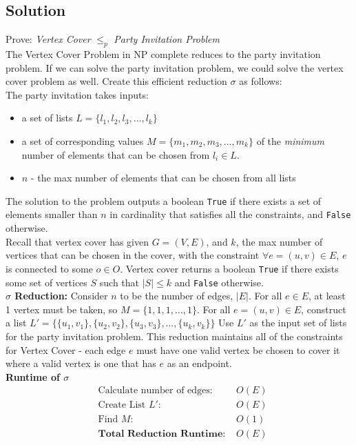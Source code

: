 \documentclass[11pt]{article}
\begin{document}
\subsection{Solution}

Prove: \textit{Vertex Cover} $\leq_p$ \textit{Party Invitation Problem}\\

The Vertex Cover Problem in NP complete reduces to the party invitation problem. If we can solve the party invitation problem, we could solve the vertex cover problem as well. Create this efficient reduction $\sigma$ as follows:  \\

The party invitation takes inputs:
\begin{itemize}
\item a set of lists $L = \{l_1,l_2,l_3, \ldots, l_{k}\}$
\item a set of corresponding values $M = \{m_1, m_2, m_3, \ldots, m_k\}$ of the \textit{minimum} number of elements that can be chosen from $l_i \in L$.
\item $n$ - the max number of elements that can be chosen from all lists
\end{itemize}

The solution to the problem outputs a boolean \texttt{True} if there exists a set of elements smaller than $n$ in cardinality  that satisfies all the constraints, and \texttt{False} otherwise.\\

Recall that vertex cover has given $G = (V,E)$, and $k$, the max number of vertices that can be chosen in the cover, with the constraint $\forall e = (u,v) \in E$, $e$ is connected to some $o \in O$. Vertex cover returns a boolean \texttt{True} if there exists some set of vertices $S$ such that $|S| \leq k $ and \texttt{False} otherwise. \\

\textbf{$\sigma$ Reduction:}
Consider $n$ to be the number of edges, $|E|$. For all $e \in E$, at least 1 vertex must be taken, so $M = \{1,1,1,\ldots, 1\}$. For all $e = (u,v) \in E$, construct a list $L' = \{\{u_1,v_1\},\{u_2,v_2\},\{u_3,v_3\},\ldots, \{u_k,v_k\}\}$ Use $L'$ as the input set of lists for the party invitation problem. This reduction maintains all of the constraints for Vertex Cover -  each edge $e$ must have one valid vertex be chosen to cover it where a valid vertex is one that has $e$ as an endpoint. \\

\textbf{Runtime of $\sigma$}
\begin{align*}
&\text{Calculate number of edges: } &O(E)\\ 
&\text{Create List $L'$: } &O(E)\\ 
&\text{Find $M$: } &O(1)\\
&\textbf{Total Reduction Runtime: } &O(E)\\
\end{align*}
\end{document}
